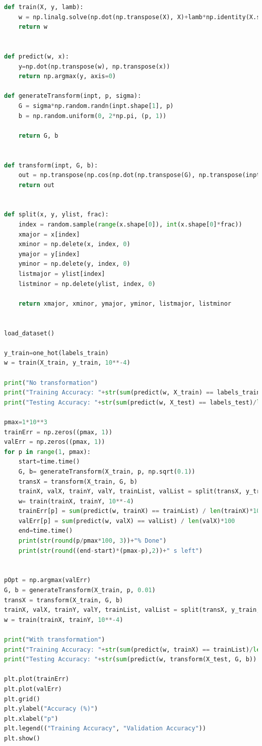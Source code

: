 \documentclass{article}
\newcommand{\1}{\mathbf{1}}
\begin{document}
\begin{enumerate}
\begin{lstlisting}[language=Python]
def train(X, y, lamb):
    w = np.linalg.solve(np.dot(np.transpose(X), X)+lamb*np.identity(X.shape[1]), np.dot(np.transpose(X), y))
    return w


def predict(w, x):
    y=np.dot(np.transpose(w), np.transpose(x))
    return np.argmax(y, axis=0)

def generateTransform(inpt, p, sigma):
    G = sigma*np.random.randn(inpt.shape[1], p)
    b = np.random.uniform(0, 2*np.pi, (p, 1))

    return G, b


def transform(inpt, G, b):
    out = np.transpose(np.cos(np.dot(np.transpose(G), np.transpose(inpt))+b))
    return out


def split(x, y, ylist, frac):
    index = random.sample(range(x.shape[0]), int(x.shape[0]*frac))
    xmajor = x[index]
    xminor = np.delete(x, index, 0)
    ymajor = y[index]
    yminor = np.delete(y, index, 0)
    listmajor = ylist[index]
    listminor = np.delete(ylist, index, 0)

    return xmajor, xminor, ymajor, yminor, listmajor, listminor


load_dataset()

y_train=one_hot(labels_train)
w = train(X_train, y_train, 10**-4)

print("No transformation")
print("Training Accuracy: "+str(sum(predict(w, X_train) == labels_train)/len(X_train)*100)+"%")
print("Testing Accuracy: "+str(sum(predict(w, X_test) == labels_test)/len(X_test)*100)+"%")

pmax=1*10**3
trainErr = np.zeros((pmax, 1))
valErr = np.zeros((pmax, 1))
for p in range(1, pmax):
    start=time.time()
    G, b= generateTransform(X_train, p, np.sqrt(0.1))
    transX = transform(X_train, G, b)
    trainX, valX, trainY, valY, trainList, valList = split(transX, y_train, labels_train, 0.8)
    w= train(trainX, trainY, 10**-4)
    trainErr[p] = sum(predict(w, trainX) == trainList) / len(trainX)*100
    valErr[p] = sum(predict(w, valX) == valList) / len(valX)*100
    end=time.time()
    print(str(round(p/pmax*100, 3))+"% Done")
    print(str(round((end-start)*(pmax-p),2))+" s left")


pOpt = np.argmax(valErr)
G, b = generateTransform(X_train, p, 0.01)
transX = transform(X_train, G, b)
trainX, valX, trainY, valY, trainList, valList = split(transX, y_train, labels_train, 0.8)
w = train(trainX, trainY, 10**-4)

print("With transformation")
print("Training Accuracy: "+str(sum(predict(w, trainX) == trainList)/len(trainX)*100)+"%")
print("Testing Accuracy: "+str(sum(predict(w, transform(X_test, G, b)) == labels_test)/len(X_test)*100)+"%")

plt.plot(trainErr)
plt.plot(valErr)
plt.grid()
plt.ylabel("Accuracy (%)")
plt.xlabel("p")
plt.legend(("Training Accuracy", "Validation Accuracy"))
plt.show()
\end{lstlisting}


\end{enumerate}
\end{document}
